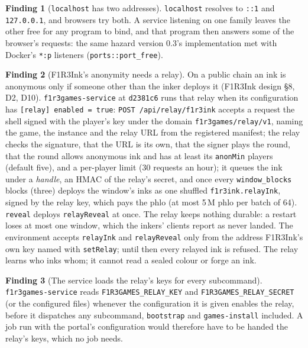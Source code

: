 \documentclass[11pt]{article}
\theoremstyle{definition}
\newtheorem{finding}{Finding}
\theoremstyle{remark}
\newcommand{\code}[1]{\texttt{#1}}
\newcommand{\Svc}{\code{f1r3games-service}}
\begin{document}
\begin{finding}[\code{localhost} has two addresses]\label{f:dualstack}
\code{localhost} resolves to \code{::1} and \code{127.0.0.1}, and browsers try both.
A service listening on one family leaves the other free for any program to bind, and
that program then answers some of the browser's requests: the same hazard version
0.3's implementation met with Docker's \code{*:p} listeners (\code{ports::port\_free}).
\end{finding}

\begin{finding}[F1R3Ink's anonymity needs a relay]\label{f:relay}
On a public chain an ink is anonymous only if someone other than the inker deploys it
(F1R3Ink design \S8, D2, D10). \Svc{} at \code{d2381c6} runs that relay when its
configuration has \code{[relay] enabled = true}: \code{POST /api/relay/f1r3ink}
accepts a request the shell signed with the player's key under the domain
\code{f1r3games/relay/v1}, naming the game, the instance and the relay URL from the
registered manifest; the relay checks the signature, that the URL is its own, that the
signer plays the round, that the round allows anonymous ink and has at least its
\code{anonMin} players (default five), and a per-player limit (30 requests an hour);
it queues the ink under a \emph{handle}, an HMAC of the relay's secret, and once every
\code{window\_blocks} blocks (three) deploys the window's inks as one shuffled
\code{f1r3ink.relayInk}, signed by the relay key, which pays the phlo (at most
5\,M phlo per batch of 64). \code{reveal} deploys \code{relayReveal} at once. The
relay keeps nothing durable: a restart loses at most one window, which the inkers'
clients report as never landed. The environment accepts \code{relayInk} and
\code{relayReveal} only from the address F1R3Ink's own key named with
\code{setRelay}; until then every relayed ink is refused. The relay learns who inks
whom; it cannot read a sealed colour or forge an ink.
\end{finding}

\begin{finding}[The service loads the relay's keys for every subcommand]\label{f:relaykeys}
\Svc{} reads \code{F1R3GAMES\_RELAY\_KEY} and \code{F1R3GAMES\_RELAY\_SECRET} (or the
configured files) whenever the configuration it is given enables the relay, before it
dispatches any subcommand, \code{bootstrap} and \code{games-install} included. A job
run with the portal's configuration would therefore have to be handed the relay's
keys, which no job needs.
\end{finding}
\end{document}
